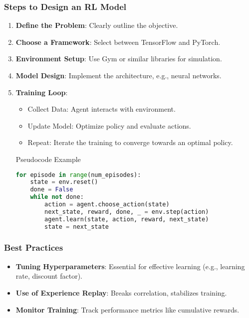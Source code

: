 \documentclass[aspectratio=169]{beamer}
\begin{document}
\begin{frame}[fragile]
    \frametitle{Steps to Design an RL Model}
    \begin{enumerate}
        \item \textbf{Define the Problem}: Clearly outline the objective.
        \item \textbf{Choose a Framework}: Select between TensorFlow and PyTorch.
        \item \textbf{Environment Setup}: Use Gym or similar libraries for simulation.
        \item \textbf{Model Design}: Implement the architecture, e.g., neural networks.
        \item \textbf{Training Loop}:
        \begin{itemize}
            \item Collect Data: Agent interacts with environment.
            \item Update Model: Optimize policy and evaluate actions.
            \item Repeat: Iterate the training to converge towards an optimal policy.
        \end{itemize}
        \begin{block}{Pseudocode Example}
        \begin{lstlisting}[language=Python]
for episode in range(num_episodes):
    state = env.reset()
    done = False
    while not done:
        action = agent.choose_action(state)
        next_state, reward, done, _ = env.step(action)
        agent.learn(state, action, reward, next_state)
        state = next_state
        \end{lstlisting}
        \end{block}
    \end{enumerate}
\end{frame}

\begin{frame}[fragile]
    \frametitle{Best Practices}
    \begin{itemize}
        \item \textbf{Tuning Hyperparameters}: Essential for effective learning (e.g., learning rate, discount factor).
        \item \textbf{Use of Experience Replay}: Breaks correlation, stabilizes training.
        \item \textbf{Monitor Training}: Track performance metrics like cumulative rewards.
    \end{itemize}
\end{frame}
\end{document}
